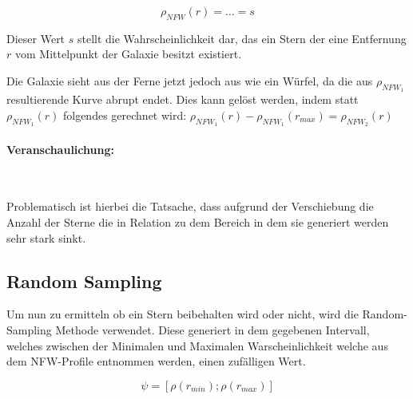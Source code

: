 \begin{equation}
\rho_{NFW}(r) = \dots = s
\end{equation}

Dieser Wert \( s \) stellt die Wahrscheinlichkeit dar, das ein Stern der
eine Entfernung \( r \) vom Mittelpunkt der Galaxie besitzt existiert.

Die Galaxie sieht aus der Ferne jetzt jedoch aus wie ein Würfel, da die aus \(
\rho_{NFW_{1}} \) resultierende Kurve abrupt endet. Dies kann gelöst werden,
indem statt \( \rho_{NFW_{1}}(r) \) folgendes gerechnet wird: \(
\rho_{NFW_{1}}(r) - \rho_{NFW_{1}}(r_{max}) = \rho_{NFW_{2}}(r)\)

\paragraph{Veranschaulichung:}~\\

\begin{center}
\end{center}

Problematisch ist hierbei die Tatsache, dass aufgrund der Verschiebung die
Anzahl der Sterne die in Relation zu dem Bereich in dem sie generiert werden
sehr stark sinkt.

\subsection{Random Sampling} \label{subsec:random_sampling}

Um nun zu ermitteln ob ein Stern beibehalten wird oder nicht, wird die
Random-Sampling Methode verwendet.  Diese generiert in dem gegebenen Intervall,
welches zwischen der Minimalen und Maximalen Warscheinlichkeit welche aus dem
NFW-Profile entnommen werden, einen zufälligen Wert.

\begin{equation}\label{range:psi}
    \psi = [ \rho(r_{min}); \rho(r_{max}) ] 
\end{equation}

